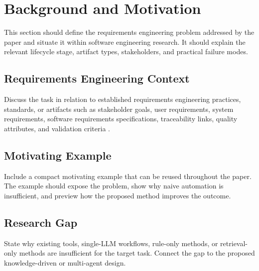 \section{Background and Motivation}

This section should define the requirements engineering problem addressed by the paper and situate it within software engineering research. It should explain the relevant lifecycle stage, artifact types, stakeholders, and practical failure modes.

\subsection{Requirements Engineering Context}

Discuss the task in relation to established requirements engineering practices, standards, or artifacts such as stakeholder goals, user requirements, system requirements, software requirements specifications, traceability links, quality attributes, and validation criteria \cite{iso29148,nuseibeh2000requirements,wiegers2013software}.

\subsection{Motivating Example}

Include a compact motivating example that can be reused throughout the paper. The example should expose the problem, show why naive automation is insufficient, and preview how the proposed method improves the outcome.

\subsection{Research Gap}

State why existing tools, single-LLM workflows, rule-only methods, or retrieval-only methods are insufficient for the target task. Connect the gap to the proposed knowledge-driven or multi-agent design.

